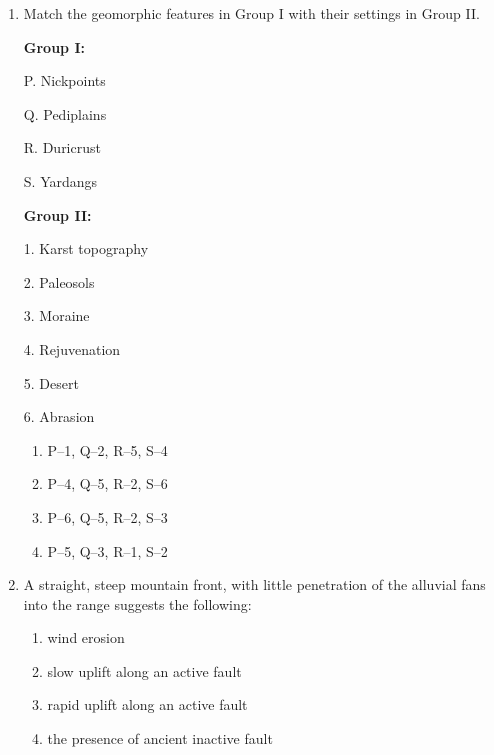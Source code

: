 \documentclass[journal,12pt,onecolumn]{IEEEtran}
\theoremstyle{remark}
\begin{document}
\begin{enumerate}[resume]
\item Match the geomorphic features in Group I with their settings in Group II.

\noindent
\begin{minipage}[t]{0.45\textwidth}
\textbf{Group I:}  

P. Nickpoints  

Q. Pediplains  

R. Duricrust  

S. Yardangs  
\end{minipage}
\hfill
\begin{minipage}[t]{0.45\textwidth}
\textbf{Group II:}  

1. Karst topography  

2. Paleosols  

3. Moraine  

4. Rejuvenation  

5. Desert  

6. Abrasion  
\end{minipage}

\vspace{0.3cm}

\begin{multicols}{2}
\begin{enumerate}
\item P--1, Q--2, R--5, S--4  
\item P--4, Q--5, R--2, S--6  
\item P--6, Q--5, R--2, S--3  
\item P--5, Q--3, R--1, S--2  
\end{enumerate}
\end{multicols}
\vspace{0.5cm}

\item A straight, steep mountain front, with little penetration of the alluvial fans into the range suggests the following:

\begin{multicols}{2}
\begin{enumerate}
\item wind erosion  
\item slow uplift along an active fault  
\item rapid uplift along an active fault  
\item the presence of ancient inactive fault  
\end{enumerate}
\end{multicols}
\vspace{0.5cm}


\end{enumerate}
\end{document}
